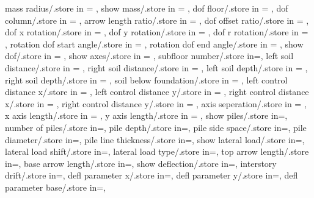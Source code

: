 {  mass radius/.store in = \massrad,
  show mass/.store in = \showmass,
  dof floor/.store in = \doflocfloor,
  dof column/.store in = \dofloccolumn,
  arrow length ratio/.store in = \arrowlenratio,
  dof offset ratio/.store in = \dofoffsetratio,
  dof x rotation/.store in = \dofxrotation,
  dof y rotation/.store in = \dofyrotation,
  dof r rotation/.store in = \dofrrotation,
  rotation dof start angle/.store in = \rotdofstartangle,
  rotation dof end angle/.store in = \rotdofendangle,
  show dof/.store in = \showdof,
  show axes/.store in = \showaxes,
  subfloor number/.store in=\subfloors,
  left soil distance/.store in = \leftsoildist,
  right soil distance/.store in = \rightsoildist,
  left soil depth/.store in = \leftsoildepth,
  right soil depth/.store in = \rightsoildepth,
  soil below foundation/.store in = \soilbelowfound,
  left control distance x/.store in = \leftcontrolx,
  left control distance y/.store in = \leftcontroly,
  right control distance x/.store in = \rightcontrolx,
  right control distance y/.store in = \rightcontroly,
  axis seperation/.store in = \axisseperation,
  x axis length/.store in = \axeslenX,
  y axis length/.store in = \axeslenY,
  show piles/.store in=\showpiles,
  number of piles/.store in=\numberofpiles,
  pile depth/.store in=\piledepth,
  pile side space/.store in=\pilesidespace,
  pile diameter/.store in=\pilediameter,
  pile line thickness/.store in=\pilelinethickness,
  show lateral load/.store in=\showlatload,
  lateral load shift/.store in=\latloadshift,
  lateral load type/.store in=\latloadtype,
  top arrow length/.store in=\toparrlen,
  base arrow length/.store in=\basearrlen,
  show deflection/.store in=\showdefl, 
  interstory drift/.store in=\drift,
  defl parameter x/.store in=,
  defl parameter y/.store in=,
  defl parameter base/.store in=,}

